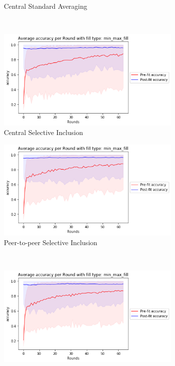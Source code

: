 \documentclass[12pt]{article}
\begin{document}
\begin{figure}[H]
\begin{subfigure}{0.45\textwidth}
    \caption{Central Standard Averaging}
\end{subfigure}%
\\
\begin{subfigure}{0.45\textwidth}
    \raggedleft
    \includegraphics[width=\textwidth]{resources/posture_stdround-stdsplit-accuracy.png}
    \caption{Central Selective Inclusion}
\end{subfigure}
\begin{subfigure}{0.45\textwidth}
    \raggedleft
    \includegraphics[width=\textwidth]{resources/posture_stdround_p2p-stdsplit-accuracy.png}
    \caption{Peer-to-peer Selective Inclusion}
\end{subfigure}
\\
\begin{subfigure}{0.45\textwidth}
    \raggedleft
    \includegraphics[width=\textwidth]{resources/posture_weightround-stdsplit-accuracy.png}

\end{subfigure}
\end{figure}
\end{document}
